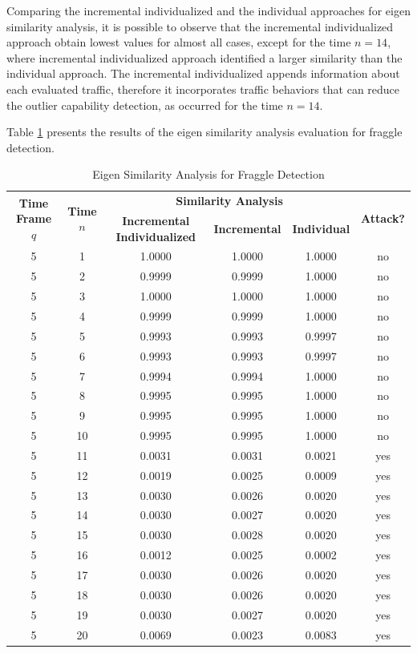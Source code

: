 Comparing the incremental individualized and the individual approaches for eigen similarity analysis, it is possible to observe that the incremental individualized approach obtain lowest values for almost all cases, except for the time $n=14$, where incremental individualized approach identified a larger similarity than the individual approach. The incremental individualized appends information about each evaluated traffic, therefore it incorporates traffic behaviors that can reduce the outlier capability detection, as occurred for the time $n=14$.

Table \ref{tab:tab7} presents the results of the eigen similarity analysis evaluation for fraggle detection.

\begin{table}[h!]
  \centering
  \footnotesize
  \caption{Eigen Similarity Analysis for Fraggle Detection}
  \label{tab:tab7}
  \begin{tabular}{ c c c c c c }
	\toprule
	\multirow{2}{*}{\textbf{Time Frame} $q$} &\multirow{2}{*}{\textbf{Time} $n$}   &\multicolumn{3}{c}{\textbf{Similarity Analysis}} &\multirow{2}{*}{\textbf{Attack?}}\\ 
			\hhline{~~---~}
			& &\textbf{Incremental Individualized} &\textbf{Incremental} &\textbf{Individual}\\
	\midrule
	5 &1 &1.0000 &1.0000 &1.0000 &no \\
	5 &2 &0.9999 &0.9999 &1.0000 &no \\
	5 &3 &1.0000 &1.0000 &1.0000 &no \\
	5 &4 &0.9999 &0.9999 &1.0000 &no \\
	5 &5 &0.9993 &0.9993 &0.9997 &no \\
	5 &6 &0.9993 &0.9993 &0.9997 &no \\
	5 &7 &0.9994 &0.9994 &1.0000 &no \\
	5 &8 &0.9995 &0.9995 &1.0000 &no \\
	5 &9 &0.9995 &0.9995 &1.0000 &no \\
	5 &10 &0.9995 &0.9995 &1.0000 &no \\
	5 &11 &0.0031 &0.0031 &0.0021 &yes \\
	5 &12 &0.0019 &0.0025 &0.0009 &yes \\
	5 &13 &0.0030 &0.0026 &0.0020 &yes \\
	5 &14 &0.0030 &0.0027 &0.0020 &yes \\
	5 &15 &0.0030 &0.0028 &0.0020 &yes \\
	5 &16 &0.0012 &0.0025 &0.0002 &yes \\
	5 &17 &0.0030 &0.0026 &0.0020 &yes \\
	5 &18 &0.0030 &0.0026 &0.0020 &yes \\
	5 &19 &0.0030 &0.0027 &0.0020 &yes \\
	5 &20 &0.0069 &0.0023 &0.0083 &yes \\
    \bottomrule
  \end{tabular}
\end{table}

